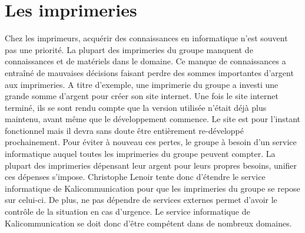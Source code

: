 
\section{Les imprimeries}
Chez les imprimeurs, acquérir des connaissances en informatique n'est souvent pas une priorité. La plupart des imprimeries du groupe manquent de connaissances et de matériels dans le domaine. Ce manque de connaissances a entraîné de mauvaises décisions faisant perdre des sommes importantes d'argent aux imprimeries.\newline
A titre d'exemple, une imprimerie du groupe a investi une grande somme d'argent pour créer son site internet. Une fois le site internet terminé, ils se sont rendu compte que la version utilisée n'était déjà plus maintenu, avant même que le développement commence. Le site est pour l'instant fonctionnel mais il devra sans doute être entièrement re-développé prochainement.\newline
Pour éviter à nouveau ces pertes, le groupe à besoin d'un service informatique auquel toutes les imprimeries du groupe peuvent compter. La plupart des imprimeries dépensant leur argent pour leurs propres besoins, unifier ces dépenses s'impose. Christophe Lenoir tente donc d'étendre le service informatique de Kalicommunication pour que les imprimeries du groupe se repose sur celui-ci. De plus, ne pas dépendre de services externes permet d'avoir le contrôle de la situation en cas d'urgence. Le service informatique de Kalicommunication se doit donc d'être compétent dans de nombreux domaines.


